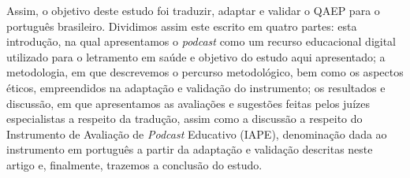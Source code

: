 Assim, o objetivo deste estudo foi traduzir, adaptar e validar o QAEP para o português brasileiro. Dividimos assim este escrito em quatro partes: esta introdução, na  qual apresentamos o \textit{podcast} como um recurso educacional digital utilizado para o letramento em saúde e objetivo do estudo aqui apresentado; a metodologia, em que descrevemos o percurso metodológico, bem como os aspectos éticos, empreendidos na  adaptação e validação do instrumento; os resultados e discussão, em que apresentamos as avaliações e sugestões feitas pelos juízes especialistas a respeito da tradução, assim como a discussão a respeito do Instrumento de Avaliação de \textit{Podcast} Educativo (IAPE), denominação dada ao instrumento em português a partir da adaptação e validação descritas neste artigo e, finalmente, trazemos a conclusão do estudo.
